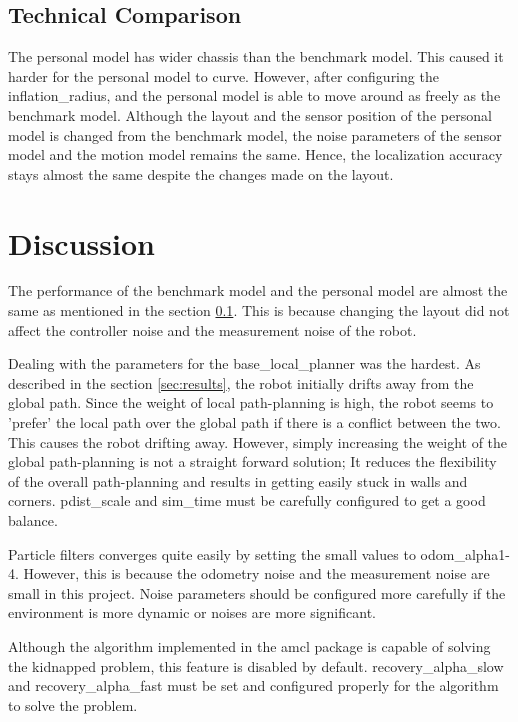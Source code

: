 \documentclass[10pt,journal,compsoc]{IEEEtran}
\begin{document}
\subsection{Technical Comparison}
\label{sec:technical_comparison}
The personal model has wider chassis than the benchmark model. This caused  it harder for the personal model to curve. However, after configuring the inflation\_radius, and the personal model is able to move around as freely as the benchmark model. Although the layout and the sensor position of the personal model is changed from the benchmark model, the noise parameters of the sensor model and the motion model remains the same. Hence, the localization accuracy stays almost the same despite the changes made on the layout.

\section{Discussion}
The performance of the benchmark model and the personal model are almost the same as mentioned in the section \ref{sec:technical_comparison}. This is because changing the layout did not affect the controller noise and the measurement noise of the robot.

Dealing with the parameters for the base\_local\_planner was the hardest. As described in the section \ref{sec:results}, the robot initially drifts away from the global path. Since the weight of local path-planning is high, the robot seems to 'prefer' the local path over the global path if there is a conflict between the two. This causes the robot drifting away. However, simply increasing the weight of the global path-planning is not a straight forward solution; It reduces the flexibility of the overall path-planning and results in getting easily stuck in walls and corners. pdist\_scale and sim\_time must be carefully configured to get a good balance.

Particle filters converges quite easily by setting the small values to odom\_alpha{1-4}. However, this is because the odometry noise and the measurement noise are small in this project. Noise parameters should be configured more carefully if the environment is more dynamic or noises are more significant.

Although the algorithm implemented in the amcl package is capable of solving the kidnapped problem, this feature is disabled by default. recovery\_alpha\_slow and recovery\_alpha\_fast must be set and configured properly for the algorithm to solve the problem.
\end{document}
